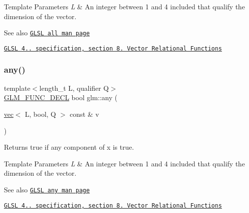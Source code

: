 \begin{DoxyTemplParams}{Template Parameters}
{\em L} & An integer between 1 and 4 included that qualify the dimension of the vector.\\
\hline
\end{DoxyTemplParams}
\begin{DoxySeeAlso}{See also}
\href{http://www.opengl.org/sdk/docs/manglsl/xhtml/all.xml}{\tt G\+L\+SL all man page} 

\href{http://www.opengl.org/registry/doc/GLSLangSpec.4.20.8.pdf}{\tt G\+L\+SL 4.. specification, section 8. Vector Relational Functions} 
\end{DoxySeeAlso}
\mbox{\label{group__core__func__vector__relational_gadcc289349a96ef7642b14bc151ee4ae8}} 
\subsubsection{\texorpdfstring{any()}{any()}}
{\footnotesize\ttfamily template$<$length\+\_\+t L, qualifier Q$>$ \\
\hyperlink{setup_8hpp_ab2d052de21a70539923e9bcbf6e83a51}{G\+L\+M\+\_\+\+F\+U\+N\+C\+\_\+\+D\+E\+CL} bool glm\+::any (\begin{DoxyParamCaption}\item[{\hyperlink{structglm_1_1vec}{vec}$<$ L, bool, Q $>$ const \&}]{v }\end{DoxyParamCaption})}

Returns true if any component of x is true.


\begin{DoxyTemplParams}{Template Parameters}
{\em L} & An integer between 1 and 4 included that qualify the dimension of the vector.\\
\hline
\end{DoxyTemplParams}
\begin{DoxySeeAlso}{See also}
\href{http://www.opengl.org/sdk/docs/manglsl/xhtml/any.xml}{\tt G\+L\+SL any man page} 

\href{http://www.opengl.org/registry/doc/GLSLangSpec.4.20.8.pdf}{\tt G\+L\+SL 4.. specification, section 8. Vector Relational Functions} 
\end{DoxySeeAlso}
\mbox{\label{group__core__func__vector__relational_ga774f9e3a93c913f1e7c215a549707d59}} 
